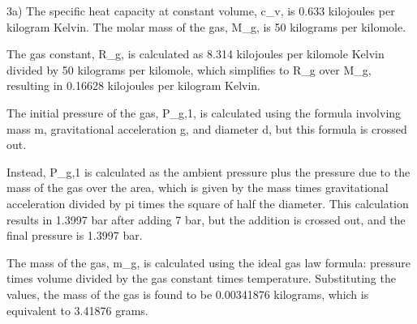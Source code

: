 3a) The specific heat capacity at constant volume, c_v, is 0.633 kilojoules per kilogram Kelvin. The molar mass of the gas, M_g, is 50 kilograms per kilomole.

The gas constant, R_g, is calculated as 8.314 kilojoules per kilomole Kelvin divided by 50 kilograms per kilomole, which simplifies to R_g over M_g, resulting in 0.16628 kilojoules per kilogram Kelvin.

The initial pressure of the gas, P_{g,1}, is calculated using the formula involving mass m, gravitational acceleration g, and diameter d, but this formula is crossed out.

Instead, P_{g,1} is calculated as the ambient pressure plus the pressure due to the mass of the gas over the area, which is given by the mass times gravitational acceleration divided by pi times the square of half the diameter. This calculation results in 1.3997 bar after adding 7 bar, but the addition is crossed out, and the final pressure is 1.3997 bar.

The mass of the gas, m_g, is calculated using the ideal gas law formula: pressure times volume divided by the gas constant times temperature. Substituting the values, the mass of the gas is found to be 0.00341876 kilograms, which is equivalent to 3.41876 grams.